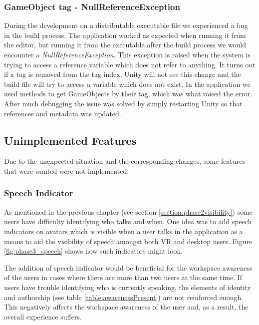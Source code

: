\subsubsection{GameObject tag - NullReferenceException}
During the development on a distributable executable file we experienced a bug in the build process. The application worked as expected when running it from the editor, but running it from the executable after the build process we would encounter a \textit{NullReferenceException}. This exception is raised when the system is trying to access a reference variable which does not refer to anything. It turns out if a tag is removed from the tag index, Unity will not see this change and the build file will try to access a variable which does not exist. In the application we used methods to get GameObjects by their tag, which was what raised the error. After much debugging the issue was solved by simply restarting Unity so that references and metadata was updated.  


\subsection{Unimplemented Features}
Due to the unexpected situation and the corresponding changes, some features that were wanted were not implemented. 

\subsubsection{Speech Indicator}
As mentioned in the previous chapter (see section \ref{section:phase2visibility}) some users have difficulty identifying who talks and when. One idea was to add speech indicators on avatars which is visible when a user talks in the application as a means to aid the visibility of speech amongst both VR and desktop users. Figure \ref{fig:phase3_speech} shows how such indicators might look.

The addition of speech indicator would be beneficial for the workspace awareness of the users in cases where there are more than two users at the same time. If users have trouble identifying who is currently speaking, the elements of identity and authorship (see table \ref{table:awarenessPresent}) are not reinforced enough. This negatively affects the workspace awareness of the user and, as a result, the overall experience suffers.


